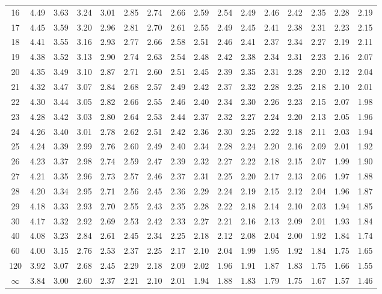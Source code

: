 \documentclass[lang=cn,10pt]{elegantbook}
\begin{document}
\begin{longtable}{c|ccccccccccccccc}
    16 & 4.49 & 3.63 & 3.24 & 3.01 & 2.85 & 2.74 & 2.66 & 2.59 & 2.54 & 2.49 & 2.46 & 2.42 & 2.35 & 2.28 & 2.19 \\
    17 & 4.45 & 3.59 & 3.20 & 2.96 & 2.81 & 2.70 & 2.61 & 2.55 & 2.49 & 2.45 & 2.41 & 2.38 & 2.31 & 2.23 & 2.15 \\
    18 & 4.41 & 3.55 & 3.16 & 2.93 & 2.77 & 2.66 & 2.58 & 2.51 & 2.46 & 2.41 & 2.37 & 2.34 & 2.27 & 2.19 & 2.11 \\
    19 & 4.38 & 3.52 & 3.13 & 2.90 & 2.74 & 2.63 & 2.54 & 2.48 & 2.42 & 2.38 & 2.34 & 2.31 & 2.23 & 2.16 & 2.07 \\
    20 & 4.35 & 3.49 & 3.10 & 2.87 & 2.71 & 2.60 & 2.51 & 2.45 & 2.39 & 2.35 & 2.31 & 2.28 & 2.20 & 2.12 & 2.04 \\
    21 & 4.32 & 3.47 & 3.07 & 2.84 & 2.68 & 2.57 & 2.49 & 2.42 & 2.37 & 2.32 & 2.28 & 2.25 & 2.18 & 2.10 & 2.01 \\
    22 & 4.30 & 3.44 & 3.05 & 2.82 & 2.66 & 2.55 & 2.46 & 2.40 & 2.34 & 2.30 & 2.26 & 2.23 & 2.15 & 2.07 & 1.98 \\
    23 & 4.28 & 3.42 & 3.03 & 2.80 & 2.64 & 2.53 & 2.44 & 2.37 & 2.32 & 2.27 & 2.24 & 2.20 & 2.13 & 2.05 & 1.96 \\
    24 & 4.26 & 3.40 & 3.01 & 2.78 & 2.62 & 2.51 & 2.42 & 2.36 & 2.30 & 2.25 & 2.22 & 2.18 & 2.11 & 2.03 & 1.94 \\
    25 & 4.24 & 3.39 & 2.99 & 2.76 & 2.60 & 2.49 & 2.40 & 2.34 & 2.28 & 2.24 & 2.20 & 2.16 & 2.09 & 2.01 & 1.92 \\
    26 & 4.23 & 3.37 & 2.98 & 2.74 & 2.59 & 2.47 & 2.39 & 2.32 & 2.27 & 2.22 & 2.18 & 2.15 & 2.07 & 1.99 & 1.90 \\
    27 & 4.21 & 3.35 & 2.96 & 2.73 & 2.57 & 2.46 & 2.37 & 2.31 & 2.25 & 2.20 & 2.17 & 2.13 & 2.06 & 1.97 & 1.88 \\
    28 & 4.20 & 3.34 & 2.95 & 2.71 & 2.56 & 2.45 & 2.36 & 2.29 & 2.24 & 2.19 & 2.15 & 2.12 & 2.04 & 1.96 & 1.87 \\
    29 & 4.18 & 3.33 & 2.93 & 2.70 & 2.55 & 2.43 & 2.35 & 2.28 & 2.22 & 2.18 & 2.14 & 2.10 & 2.03 & 1.94 & 1.85 \\
    30 & 4.17 & 3.32 & 2.92 & 2.69 & 2.53 & 2.42 & 2.33 & 2.27 & 2.21 & 2.16 & 2.13 & 2.09 & 2.01 & 1.93 & 1.84 \\
    40 & 4.08 & 3.23 & 2.84 & 2.61 & 2.45 & 2.34 & 2.25 & 2.18 & 2.12 & 2.08 & 2.04 & 2.00 & 1.92 & 1.84 & 1.74 \\
    60 & 4.00 & 3.15 & 2.76 & 2.53 & 2.37 & 2.25 & 2.17 & 2.10 & 2.04 & 1.99 & 1.95 & 1.92 & 1.84 & 1.75 & 1.65 \\
    120 & 3.92 & 3.07 & 2.68 & 2.45 & 2.29 & 2.18 & 2.09 & 2.02 & 1.96 & 1.91 & 1.87 & 1.83 & 1.75 & 1.66 & 1.55 \\
    $\infty$ & 3.84 & 3.00 & 2.60 & 2.37 & 2.21 & 2.10 & 2.01 & 1.94 & 1.88 & 1.83 & 1.79 & 1.75 & 1.67 & 1.57 & 1.46 \\
    \hline
\end{longtable}
\normalsize
\end{document}
